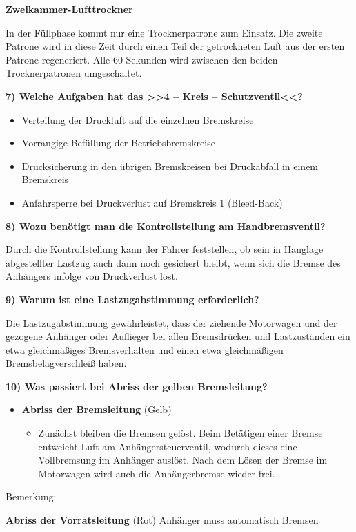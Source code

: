 \textbf{Zweikammer-Lufttrockner}

In der Füllphase kommt nur eine Trocknerpatrone zum Einsatz. Die zweite
Patrone wird in diese Zeit durch einen Teil der getrockneten Luft aus
der ersten Patrone regeneriert. Alle 60 Sekunden wird zwischen den
beiden Trocknerpatronen umgeschaltet.

\textbf{7) Welche Aufgaben hat das >>4 -- Kreis -- Schutzventil<<?}

\begin{itemize}
\item
  Verteilung der Druckluft auf die einzelnen Bremskreise
\item
  Vorrangige Befüllung der Betriebsbremskreise
\item
  Drucksicherung in den übrigen Bremskreisen bei Druckabfall in einem
  Bremskreis
\item
  Anfahrsperre bei Druckverlust auf Bremskreis 1 (Bleed-Back)
\end{itemize}

\textbf{8) Wozu benötigt man die Kontrollstellung am Handbremsventil?}

Durch die Kontrollstellung kann der Fahrer feststellen, ob sein in
Hanglage abgestellter Lastzug auch dann noch gesichert bleibt, wenn sich
die Bremse des Anhängers infolge von Druckverlust löst.

\textbf{9) Warum ist eine Lastzugabstimmung erforderlich?}

Die Lastzugabstimmung gewährleistet, dass der ziehende Motorwagen und
der gezogene Anhänger oder Auflieger bei allen Bremsdrücken und
Lastzuständen ein etwa gleichmäßiges Bremsverhalten und einen etwa
gleichmäßigen Bremsbelagverschleiß haben.

\textbf{10) Was passiert bei Abriss der gelben Bremsleitung?}

\begin{itemize}
\item
  \textbf{Abriss der Bremsleitung} (Gelb)

  \begin{itemize}
  \item
    Zunächst bleiben die Bremsen gelöst. Beim Betätigen einer Bremse
    entweicht Luft am Anhängersteuerventil, wodurch dieses eine
    Vollbremsung im Anhänger auslöst. Nach dem Lösen der Bremse im
    Motorwagen wird auch die Anhängerbremse wieder frei.
  \end{itemize}
\end{itemize}

Bemerkung:

\textbf{Abriss der Vorratsleitung} (Rot) Anhänger muss automatisch
Bremsen
